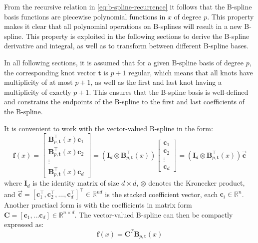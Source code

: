 From the recursive relation in \cref{eq:b-spline-recurrence} it follows that the B-spline basis functions are piecewise polynomial functions in $x$ of degree $p$. This property makes it clear that all polynomial operations on B-splines will result in a new B-spline. This property is exploited in the following sections to derive the B-spline derivative and integral, as well as to transform between different B-spline bases.

In all following sections, it is assumed that for a given B-spline basis of degree $p$, the corresponding knot vector $\mathbf t$ is $p+1$ regular, which means that all knots have multiplicity of at most $p+1$, as well as the first and last knot having a multiplicity of exactly $p+1$. This ensures that the B-spline basis is well-defined and constrains the endpoints of the B-spline to the first and last coefficients of the B-spline.


It is convenient to work with the vector-valued B-spline in the form:
\begin{equation}\label{eq:b-spline-vector-valued}
    \mathbf f(x) = \begin{bmatrix}
        \mathbf{B}_{p, \mathbf{t}}^\top(x) \mathbf c_1 \\
        \mathbf{B}_{p, \mathbf{t}}^\top(x) \mathbf c_2 \\
        \vdots \\
        \mathbf{B}_{p, \mathbf{t}}^\top(x) \mathbf c_d
    \end{bmatrix}
    = 
    (\mathbf{I}_d \otimes \mathbf{B}_{p, \mathbf{t}}^\top(x)) 
    \begin{bmatrix}
        \mathbf c_1 \\
        \mathbf c_2 \\
        \vdots \\
        \mathbf c_d
    \end{bmatrix} 
    = (\mathbf{I}_d \otimes \mathbf{B}_{p, \mathbf{t}}^\top(x)) \mathbf{\vec c}
\end{equation}
where $\mathbf{I}_d$ is the identity matrix of size $d\times d$, $\otimes$ denotes the Kronecker product, and $\mathbf{\vec c} = [\mathbf c_1^\top, \mathbf c_2^\top, \ldots, \mathbf c_d^\top]^\top\in\mathbb R^{nd}$ is the stacked coefficient vector, each $\mathbf c_i \in \mathbb R^n$. Another practiacl form is with the coefficients in matrix form $\mathbf C = [\mathbf c_1, \ldots \mathbf c_d]\in \mathbb R^{n \times d}$.  The vector-valued B-spline can then be compactly expressed as:
\begin{equation}\label{eq:b-spline-vector-valued-matrix}
    \mathbf f(x) = \mathbf C^T \mathbf B_{p, \mathbf{t}}(x) 
\end{equation}


